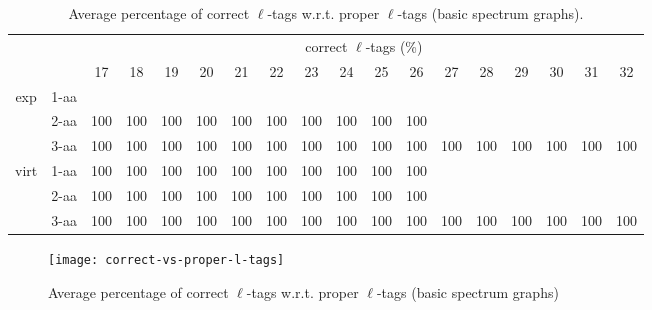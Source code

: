 \documentclass{article}[12pt]
\begin{document}
\begin{landscape}
\begin{table}[h]\tiny
\vspace{3mm}
{\centering
\begin{center}
\begin{tabular}{|c|l|c|c|c|c|c|c|c|c|c|c|c|c|c|c|c|c|}
  \hline
  \multicolumn{2}{|c|}{ } & \multicolumn{ 16 }{|c|}{ correct $\ell$-tags (\%)} \\
  \cline{3- 18}
  \multicolumn{2}{|c|}{ }  & 17 & 18 & 19 & 20 & 21 & 22 & 23 & 24 & 25 & 26 & 27 & 28 & 29 & 30 & 31 & 32\\
  \hline
  \multirow{3}{*}{exp}
&  1-aa  &  &  &  &  &  &  &  &  &  &  &  &  &  &  &  & \\
&  2-aa  & 100 & 100 & 100 & 100 & 100 & 100 & 100 & 100 & 100 & 100 &  &  &  &  &  & \\
&  3-aa  & 100 & 100 & 100 & 100 & 100 & 100 & 100 & 100 & 100 & 100 & 100 & 100 & 100 & 100 & 100 & 100\\
 \hline
  \multirow{3}{*}{virt} 
&  1-aa  & 100 & 100 & 100 & 100 & 100 & 100 & 100 & 100 & 100 & 100 &  &  &  &  &  & \\
&  2-aa  & 100 & 100 & 100 & 100 & 100 & 100 & 100 & 100 & 100 & 100 &  &  &  &  &  & \\
&  3-aa  & 100 & 100 & 100 & 100 & 100 & 100 & 100 & 100 & 100 & 100 & 100 & 100 & 100 & 100 & 100 & 100\\
 \hline
\end{tabular}
\end{center}
\par}
\centering
\caption{ Average percentage of correct $\ell$-tags w.r.t. proper $\ell$-tags (basic spectrum graphs).}
\label{table:correct-vs-proper-l-tags}
\vspace{3mm}
\end{table}

\end{landscape}

\begin{figure}
  \begin{center}
\texttt{[image: correct-vs-proper-l-tags]}
\end{center}
\caption{Average percentage of correct $\ell$-tags w.r.t. proper $\ell$-tags (basic spectrum graphs)}
  \label{fig:correct-vs-proper-l-tags}
\end{figure}
\end{document}
